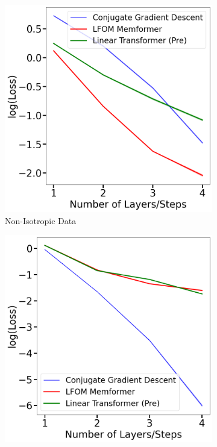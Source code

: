 \documentclass[11pt]{article}
\numberwithin{equation}{section}
\begin{document}
\vspace{-5pt}

\begin{figure}[!htbp]
  \centering
  \begin{subfigure}[b]{0.45\textwidth}
    \centering
    \includegraphics[width=\textwidth]{lfom_nonisotropic.png}
    \caption{Non-Isotropic Data}
    \label{fig:lfom_nonisotropic}
  \end{subfigure}
  \hfill
  \begin{subfigure}[b]{0.45\textwidth}
    \centering
    \includegraphics[width=\textwidth]{lfom_isotropic.png}

\end{subfigure}
\end{figure}
\end{document}
